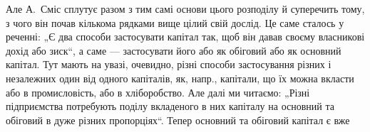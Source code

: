 Але А.~Сміс сплутує разом з тим самі основи цього розподілу й суперечить
тому, з чого він почав кількома рядками вище цілий свій
дослід. Це саме сталось у реченні: „Є два способи застосувати капітал
так, щоб він давав своєму власникові дохід або зиск“, а саме — застосувати
його або як обіговий або як основний капітал. Тут мають на увазі,
очевидно, різні способи застосування різних і незалежних один від одного
капіталів, як, напр., капітали, що їх можна вкласти або в промисловість,
або в хліборобство. Але далі ми читаємо: „Різні підприємства
потребують поділу вкладеного в них капіталу на основний та обіговий
в дуже різних пропорціях“. Тепер основний та обіговий капітал є вже
\parbreak{}  %
